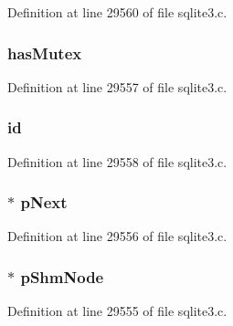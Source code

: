Definition at line 29560 of file sqlite3.\+c.

\hypertarget{structunix_shm_a89adbea4ee456e95e800b90c9076f0aa}{}
\subsubsection[{has\+Mutex}]{ has\+Mutex}\label{structunix_shm_a89adbea4ee456e95e800b90c9076f0aa}


Definition at line 29557 of file sqlite3.\+c.

\hypertarget{structunix_shm_a06b0c1fe0b3340c9767270a44106fff3}{}
\subsubsection[{id}]{ id}\label{structunix_shm_a06b0c1fe0b3340c9767270a44106fff3}


Definition at line 29558 of file sqlite3.\+c.

\hypertarget{structunix_shm_a601f6a37eec0aee557a466e524051505}{}
\subsubsection[{p\+Next}]{$\ast$ p\+Next}\label{structunix_shm_a601f6a37eec0aee557a466e524051505}


Definition at line 29556 of file sqlite3.\+c.

\hypertarget{structunix_shm_a33d94caf6216ac0179eaf8fc02bc0237}{}
\subsubsection[{p\+Shm\+Node}]{$\ast$ p\+Shm\+Node}\label{structunix_shm_a33d94caf6216ac0179eaf8fc02bc0237}


Definition at line 29555 of file sqlite3.\+c.

\hypertarget{structunix_shm_a7d537c771564d6de1ec27040e9bac2a6}{}
